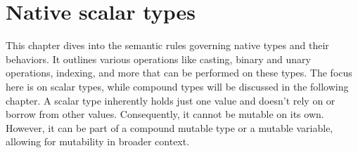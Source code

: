 \chapter{Native scalar types}
\pagecolor{gray!10!white}
\label{chap:chap3}

This chapter dives into the semantic rules governing native types and their
behaviors. It outlines various operations like casting, binary and unary
operations, indexing, and more that can be performed on these types. The focus
here is on scalar types, while compound types will be discussed in the following
chapter. A scalar type inherently holds just one value and doesn't rely on or
borrow from other values. Consequently, it cannot be mutable on its own.
However, it can be part of a compound mutable type or a mutable variable,
allowing for mutability in broader context.

\minitoc%






